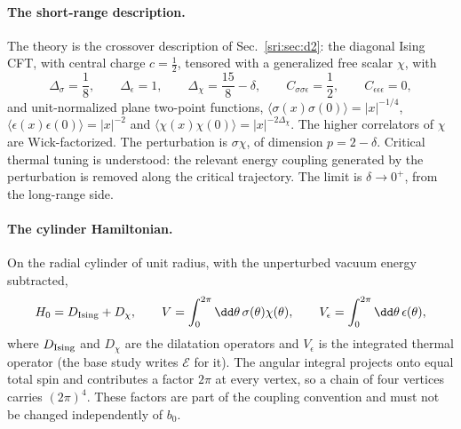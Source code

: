 \paragraph{The short-range description.} The theory is the crossover description of Sec.~\ref{sri:sec:d2}: the diagonal
Ising CFT, with central charge $c=\frac12$, tensored with a generalized free scalar $\chi$, with
\begin{equation}
 \Delta_\sigma=\frac18,\qquad \Delta_\epsilon=1,\qquad \Delta_\chi=\frac{15}{8}-\delta,\qquad
 C_{\sigma\sigma\epsilon}=\frac12,\qquad C_{\epsilon\epsilon\epsilon}=0,
\end{equation}
and unit-normalized plane two-point functions,
$\langle\sigma(x)\sigma(0)\rangle=|x|^{-1/4}$, $\langle\epsilon(x)\epsilon(0)\rangle=|x|^{-2}$ and
$\langle\chi(x)\chi(0)\rangle=|x|^{-2\Delta_\chi}$. The higher correlators of $\chi$ are Wick-factorized. The
perturbation is $\sigma\chi$, of dimension $p=2-\delta$. Critical thermal tuning is understood: the relevant energy
coupling generated by the perturbation is removed along the critical trajectory. The limit is $\delta\to0^+$, from the
long-range side.

\paragraph{The cylinder Hamiltonian.} On the radial cylinder of unit radius, with the unperturbed vacuum energy
subtracted,
\begin{equation}
 H_0=D_{\rm Ising}+D_\chi,\qquad V=\int_0^{2\pi}\dd\theta\,\sigma(\theta)\chi(\theta),\qquad
 V_\epsilon=\int_0^{2\pi}\dd\theta\,\epsilon(\theta),
 \label{sri:eq:cyl:H0}
\end{equation}
where $D_{\rm Ising}$ and $D_\chi$ are the dilatation operators and $V_\epsilon$ is the integrated thermal operator
(the base study writes $\mathcal E$ for it). The angular integral projects onto equal total spin and contributes a
factor $2\pi$ at every vertex, so a chain of four vertices carries $(2\pi)^4$. These factors are part of the coupling
convention and must not be changed independently of $b_0$.

